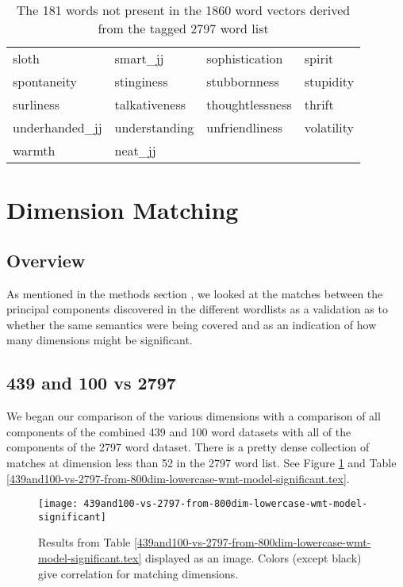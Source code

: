 \documentclass[eric_thesis.tex]{subfiles}
\begin{document}
\begin{table}[tbp]
\begin{tabular}{| llll |}
        sloth & smart\_jj & sophistication & spirit \\
        spontaneity & stinginess & stubbornness & stupidity \\
        surliness & talkativeness & thoughtlessness & thrift \\
        underhanded\_jj & understanding & unfriendliness & volatility \\
        warmth & neat\_jj &  &  \\
        \hline
    \end{tabular}
    \caption{The 181 words not present in the 1860 word vectors derived from
    the tagged 2797 word list}
    \label{tab:additionalwordsin2797combined}

\end{table}



\section{Dimension Matching}
\subsection{Overview}

As mentioned in the methods section , we looked at the matches between the principal components
discovered in the different wordlists as a validation as to whether the same
semantics were being covered and as an indication of how many dimensions might 
be significant.

\subsection{439 and 100 vs 2797}

We began our comparison of the various dimensions with a comparison of all 
components of the combined 439 and 100 word datasets with all of the components
of the 2797 word dataset. There is a pretty dense collection of matches at
dimension less than 52 in the 2797 word list. See Figure 
\ref{fig:439and100vs2797} and Table
\ref{439and100-vs-2797-from-800dim-lowercase-wmt-model-significant.tex}. 



\begin{figure}[tbp]
    \texttt{[image: 439and100-vs-2797-from-800dim-lowercase-wmt-model-significant]}
    \caption{Results from Table 
    \ref{439and100-vs-2797-from-800dim-lowercase-wmt-model-significant.tex} 
    displayed as an image. Colors (except black) give correlation for matching 
    dimensions.}
    \label{fig:439and100vs2797}
\end{figure}
\end{document}
